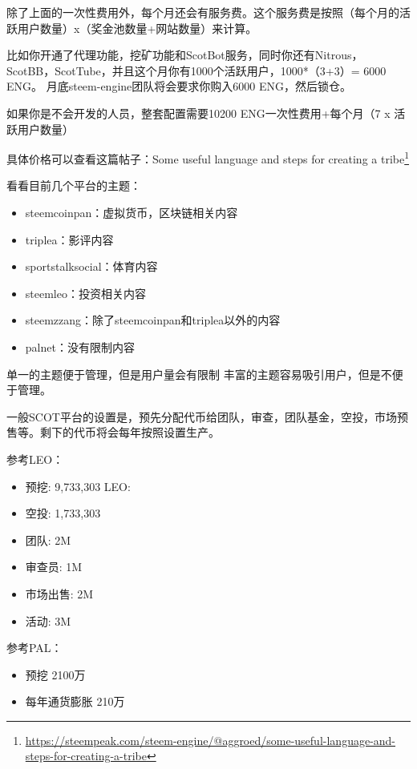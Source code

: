 \documentclass[]{ctexbook}
\providecommand{\tightlist}{%
  \setlength{\itemsep}{0pt}\setlength{\parskip}{0pt}}
\renewcommand{\href}[2]{#2\footnote{\url{#1}}}
\begin{document}
除了上面的一次性费用外，每个月还会有服务费。这个服务费是按照（每个月的活跃用户数量）x（奖金池数量+网站数量）来计算。

比如你开通了代理功能，挖矿功能和ScotBot服务，同时你还有Nitrous，ScotBB，ScotTube，并且这个月你有1000个活跃用户，1000*（3+3）= 6000 ENG。
月底steem-engine团队将会要求你购入6000 ENG，然后锁仓。

如果你是不会开发的人员，整套配置需要10200 ENG一次性费用+每个月（7 x 活跃用户数量）

具体价格可以查看这篇帖子：\href{https://steempeak.com/steem-engine/@aggroed/some-useful-language-and-steps-for-creating-a-tribe}{Some useful language and steps for creating a tribe}

看看目前几个平台的主题：

\begin{itemize}
\tightlist
\item
  steemcoinpan：虚拟货币，区块链相关内容
\item
  triplea：影评内容
\item
  sportstalksocial：体育内容
\item
  steemleo：投资相关内容
\item
  steemzzang：除了steemcoinpan和triplea以外的内容
\item
  palnet：没有限制内容
\end{itemize}

单一的主题便于管理，但是用户量会有限制
丰富的主题容易吸引用户，但是不便于管理。

一般SCOT平台的设置是，预先分配代币给团队，审查，团队基金，空投，市场预售等。剩下的代币将会每年按照设置生产。

参考LEO：

\begin{itemize}
\tightlist
\item
  预挖: 9,733,303 LEO:
\item
  空投: 1,733,303
\item
  团队: 2M
\item
  审查员: 1M
\item
  市场出售: 2M
\item
  活动: 3M
\end{itemize}

参考PAL：

\begin{itemize}
\tightlist
\item
  预挖 2100万
\item
  每年通货膨胀 210万
\end{itemize}
\end{document}
